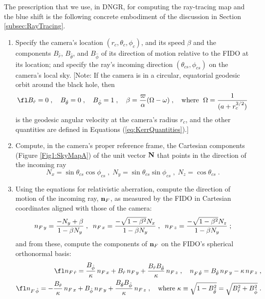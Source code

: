 \documentclass[12pt]{iopart}
\begin{document}
The prescription that we use, in DNGR, for computing the ray-tracing map and the
blue shift is the following concrete embodiment of the discussion in Section \ref{subsec:RayTracing}.

\begin{enumerate}

\item
Specify the camera's location $(r_c,\theta_c,\phi_c)$, and its speed $\beta$ and the
components $B_{\hat r}$, $B_{\hat \theta}$, and $B_{\hat \phi}$ of its direction of motion relative to
the FIDO at its location; and specify the ray's incoming direction $(\theta_{cs}, \phi_{cs})$ on the camera's local sky.  [Note: If the camera is in a circular, equatorial geodesic orbit around the black hole, then 
\begin{equation}
\fl
B_{\hat r} = 0\;,\quad B_{\hat \theta}=0\;, \quad B_{\hat \phi}=1\;, \quad
\beta = {\varpi\over\alpha}(\Omega - \omega)\;, \quad \textrm{where } \;\Omega = {1\over(a+r_c^{3/2})}
\label{eq:CircGeod}
\end{equation} 
is the 
geodesic angular velocity at the camera's radius $r_c$, and the other quantities are defined in Equations (\ref{eq:KerrQuantities}).]

\item
Compute, in the camera's proper reference frame, the Cartesian components (Figure \ref{Fig1:SkyMapA}) of the unit vector $\bf N$ that points in the direction of the incoming ray
\begin{equation}
N_x = \sin\theta_{cs} \cos\phi_{cs}\;, \;
N_y = \sin\theta_{cs} \sin\phi_{cs}\;, \;
N_z = \cos\theta_{cs}\;.
\label{eq:CameraAngles}
\end{equation}

\item
Using the equations for  relativistic aberration, compute the direction of motion
of the incoming ray, ${\bf n}_F$, as measured by the FIDO in Cartesian coordinates aligned with those of
the camera:
\begin{equation}
n_{F\,y}  = {-N_y + \beta \over 1-\beta N_y}\;, \;\;
n_{F\,x} = {- \sqrt{1-\beta^2} N_x \over 1-\beta N_y}\;,\;\;
n_{F\,z} = {- \sqrt{1-\beta^2} N_z \over 1-\beta N_y}\;;
\label{eq:aberrationA}
\end{equation}
and from these, compute the components of ${\bf n}_F$ on the FIDO's spherical
orthonormal basis:
\begin{eqnarray}
\fl 
n_{F\,\hat r} ={B_{\hat \phi}\over\kappa} \,n_{F\,x} + B_{\hat r} \,n_{F\,y} + {B_{\hat r} B_{\hat \theta}\over\kappa}
\,n_{F\,z}\;, \quad
n_{F\,\hat \theta} = B_{\hat \theta} \,n_{F\,y} - \kappa \,n_{F\,z}\;, \nonumber \\
\fl 
n_{F\, \hat \phi} = -{B_{\hat r}\over\kappa}\, n_{F\, x} + B_{\hat \phi} \, n_{F\,y} + {B_{\hat \theta} B_{\hat \phi}
\over \kappa}\, n_{F\, z}\;, \quad
\textrm{where } \kappa \equiv \sqrt{1-B_{\hat \theta}^2} = \sqrt{B_{\hat r}^2+B_{\hat \phi}^2}\;.
\label{eq:kappa}
\end{eqnarray}
\label{eq:nFtransform}


\end{enumerate}
\end{document}
